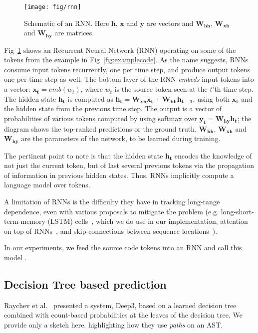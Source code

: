 \documentclass[nonacm, sigconf]{acmart}
\renewcommand{\vec}[1]{\boldsymbol{#1}}
\newcommand{\mat}[1]{\boldsymbol{#1}}
\begin{document}
\begin{figure}
    \centering
    \texttt{[image: fig/rnn]}
    \caption{Schematic of an RNN. Here $\vec{h}$, $\vec{x}$ and $\vec{y}$ are vectors and $\mat{W_{\mathbf{hh}}}$, $\mat{W_{\mathbf{xh}}}$ and $\mat{W_{\mathbf{hy}}}$ are matrices.}
    \label{fig:rnn}
\end{figure}

Fig~\ref{fig:rnn} shows an Recurrent Neural Network (RNN) operating on some of the tokens from the example in Fig~\ref{fig:examplecode}.  As the name suggests, RNNs consume input tokens recurrently, one per time step, and produce output tokens one per time step as well.  The bottom layer of the RNN \emph{embeds} input tokens into a vector: $\vec{x_t} = \mathit{emb}(\mathit{{w}_t})$, where $w_t$ is the source token seen at the $t$'th time step.  The hidden state $\vec{h_t}$ is
computed as 
\( \vec{h_t} = \mat{W_{\mathbf{xh}}} \vec{x_t} + \mat{W_{\mathbf{hh}}} \vec{h_{t-1}} \), 
using both $\vec{x_t}$ and the hidden state from the previous time step. The output is a vector of probabilities of various tokens computed by using softmax over \( \vec{y_{t}} = \mat{W_{\mathbf{hy}}}\vec{h_t} \); the diagram shows the top-ranked predictions or the ground truth.  $\mat{W_{\mathbf{hh}}}$, $\mat{W_{\mathbf{xh}}}$ and $\mat{W_{\mathbf{hy}}}$ are the parameters of the network, to be learned during training.

The pertinent point to note is that the hidden state $\vec{h_t}$ encodes the knowledge of not just the current token, but of last several previous tokens via the propagation of information in previous hidden states.  Thus, RNNs implicitly compute a language model over tokens.

A limitation of RNNs is the difficulty they have in tracking long-range dependence,  
even with various proposals to mitigate the problem (e.g. long-short-term-memory (LSTM) cells~\citep{hochreiter1997long-lstm}, which we do use in our implementation, attention on top of RNNs~\citep{iyer2016summarizing-lstm-attn}, and skip-connections between sequence locations~\citep{vinyals2015pointer}). 

In our experiments, we feed the source code tokens into an RNN and call this model \SrcRNN.


\subsection{Decision Tree based prediction}

Raychev et al.~\cite{raychev2016probabilistic-deep3-eth-dt}
presented a system, Deep3, based on a learned decision tree combined with count-based probabilities at the leaves of the decision tree.  We provide only a sketch here, highlighting how they use \emph{paths} on an AST.
\end{document}
